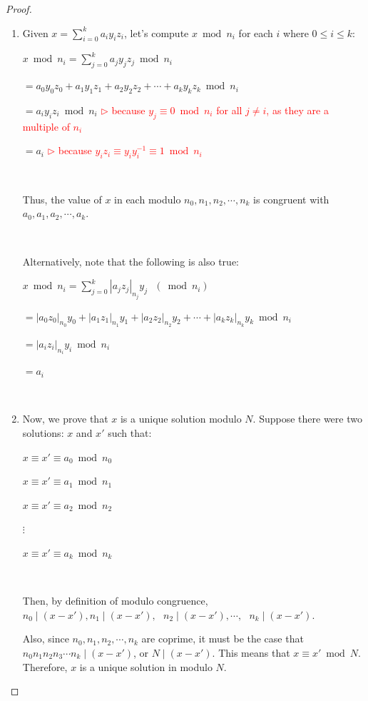 \begin{proof}

$ $

\begin{enumerate}
\item Given $x = \sum\limits_{i=0}^k a_i y_i z_i$, let's compute $x \bmod n_i$ for each $i$ where $0 \leq i \leq k$: 

$x \bmod n_i = \sum\limits_{j=0}^k a_j y_j z_j \bmod n_i$

$= a_0 y_0 z_0 + a_1 y_1 z_1 + a_2 y_2 z_2 + \cdots + a_k y_k z_k \bmod n_i$

$= a_i y_i z_i \bmod n_i$ \textcolor{red}{ $\rhd$ because $y_j \equiv 0 \bmod n_i$ for all $j \neq i$, as they are a multiple of $n_i$}

$= a_i$ \textcolor{red}{ $\rhd$ because $y_i z_i \equiv y_i y_i^{-1} \equiv 1 \bmod n_i$}

$ $

Thus, the value of $x$ in each modulo $n_0, n_1, n_2, \cdots, n_k$ is congruent with $a_0, a_1, a_2, \cdots, a_k$.


$ $

Alternatively, note that the following is also true:

$x \bmod n_i = \sum\limits_{j=0}^k |a_j z_j|_{n_j} y_j \text{ } (\bmod n_i)$

$= |a_0 z_0|_{n_0} y_0 + |a_1 z_1|_{n_1} y_1 + |a_2 z_2|_{n_2} y_2 + \cdots + |a_k z_k|_{n_k} y_k \bmod n_i$

$= |a_i z_i|_{n_i} y_i \bmod n_i$ 

$= a_i$ 

$ $

\item Now, we prove that $x$ is a unique solution modulo $N$. Suppose there were two solutions: $x$ and $x'$ such that:

$x \equiv x' \equiv a_0 \bmod n_0$

$x \equiv x' \equiv a_1 \bmod n_1$

$x \equiv x' \equiv a_2 \bmod n_2$

\text{ } $\vdots$

$x \equiv x' \equiv a_k \bmod n_k$

$ $

Then, by definition of modulo congruence, $ n_0 \mid (x - x') , n_1 \mid (x - x') , \text{ } n_2 \mid (x - x'), \cdots, \text{ } n_k \mid (x - x')$.   

Also, since $n_0, n_1, n_2, \cdots, n_k$ are coprime, it must be the case that $n_0n_1n_2n_3\cdots n_k \mid (x - x')$, or $N \mid (x - x')$. This means that $x \equiv x' \bmod N$. Therefore, $x$ is a unique solution in modulo $N$.


\end{enumerate}
\end{proof}
